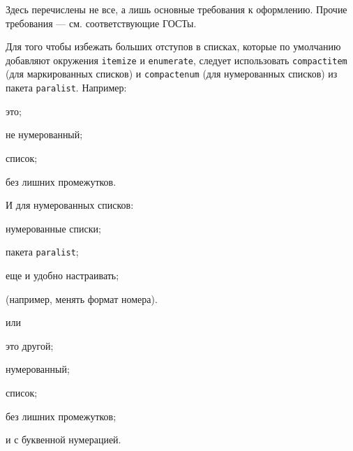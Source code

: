 Здесь перечислены не все, а лишь основные требования к оформлению. Прочие
требования --- см. соответствующие ГОСТы.

Для того чтобы избежать больших отступов в списках, которые по умолчанию добавляют окружения \texttt{itemize} и \texttt{enumerate}, следует использовать 
\texttt{compactitem} (для маркированных списков) и \texttt{compactenum} (для нумерованных списков) из пакета \texttt{paralist}. 
Например:

\begin{compactitem}
	\item это;
	\item не нумерованный;
	\item список;
	\item без лишних промежутков.
\end{compactitem}

И для нумерованных списков:

\begin{compactenum}[1)]
	\item нумерованные списки;
	\item пакета \texttt{paralist};
	\item еще и удобно настраивать;
	\item (например, менять формат номера).
\end{compactenum}

\noindent или

\begin{compactenum}[a)]
	\item это другой;
	\item нумерованный;
	\item список;
	\item без лишних промежутков;
	\item и с буквенной нумерацией.
\end{compactenum}





